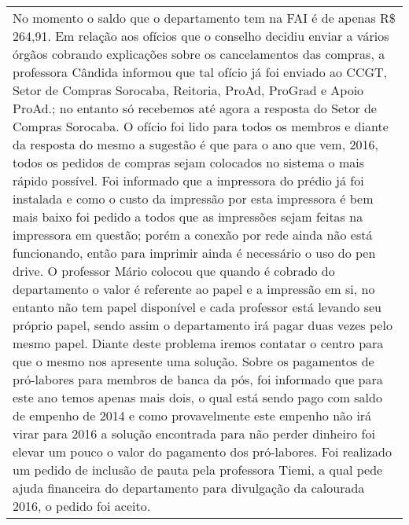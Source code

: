 \begin{longtable}{|p{17.5cm}|}
 \\ \hline 
No momento o saldo que o departamento tem na FAI é de apenas R\$ 264,91. Em relação aos ofícios que o conselho decidiu enviar a vários órgãos cobrando explicações sobre os cancelamentos das compras, a professora Cândida informou que tal ofício já foi enviado ao CCGT, Setor de Compras Sorocaba, Reitoria, ProAd, ProGrad e Apoio ProAd.; no entanto só recebemos até agora a resposta do Setor de Compras Sorocaba. O ofício foi lido para todos os membros e diante da resposta do mesmo a sugestão é que para o ano que vem, 2016, todos os pedidos de compras sejam colocados no sistema o mais rápido possível. Foi informado que a impressora do prédio já foi instalada e como o custo da impressão por esta impressora é bem mais baixo foi pedido a todos que as impressões sejam feitas na impressora em questão; porém a conexão por rede ainda não está funcionando, então para imprimir ainda é necessário o uso do pen drive. O professor Mário colocou que quando é cobrado do departamento o valor é referente ao papel e a impressão em si, no entanto não tem papel disponível e cada professor está levando seu próprio papel, sendo assim o departamento irá pagar duas vezes pelo mesmo papel. Diante deste problema iremos contatar o centro para que o mesmo nos apresente uma solução. Sobre os pagamentos de pró-labores para membros de banca da pós, foi informado que para este ano temos apenas mais dois, o qual está sendo pago com saldo de empenho de 2014 e como provavelmente este empenho não irá virar para 2016 a solução encontrada para não perder dinheiro foi elevar um pouco o valor do pagamento dos pró-labores. Foi realizado um pedido de inclusão de pauta pela professora Tiemi, a qual pede ajuda financeira do departamento para divulgação da calourada 2016, o pedido foi aceito. 

\end{longtable}
